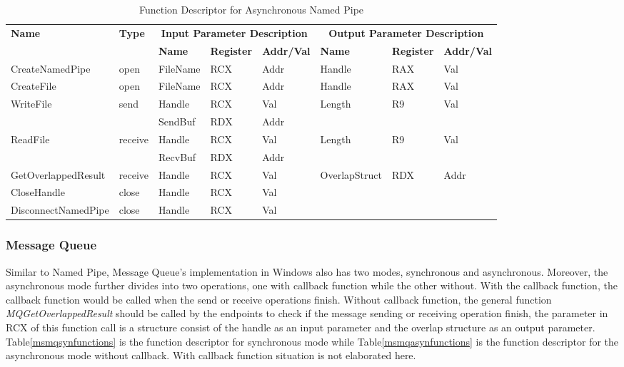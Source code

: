 \begin{table}[H]
  \centering
  \caption{Function Descriptor for Asynchronous Named Pipe}
  \label{nameasyn}
\begin{tabular}{|l|l|l|l|l|l|l|l|}
\hline
             \multirow{2}{*}{{\textbf{Name}}} & \multirow{2}{*}{{\textbf{Type}}} & \multicolumn{3}{c|}{\textbf{Input Parameter Description}} & \multicolumn{3}{c|}{\textbf{Output Parameter Description}} \\
              \cline{3-8} 
             & & \textbf{Name}& \textbf{Register} & \textbf{Addr/Val} & \textbf{Name}& \textbf{Register} &  \textbf{Addr/Val}  \\
             \hline
      CreateNamedPipe
       &open & FileName & RCX  & Addr &  Handle & RAX & Val\\
      \hline         
      CreateFile
       &open & FileName & RCX & Addr&  Handle & RAX & Val\\ 
      \hline              
      \multirow{2}{*}{WriteFile}
       &\multirow{2}{*}{send} &  Handle & RCX & Val & \multirow{2}{*}{Length} & \multirow{2}{*}{R9} & \multirow{2}{*}{Val}\\
        \cline{3-5} 
       & & SendBuf & RDX & Addr & & &\\
      \hline            
      \multirow{2}{*}{ReadFile}
       &\multirow{2}{*}{receive} &  Handle & RCX & Val& \multirow{2}{*}{Length} & \multirow{2}{*}{R9} & \multirow{2}{*}{Val}\\
        \cline{3-5} 
       & & RecvBuf & RDX  & Addr & & &\\
      \hline    
           GetOverlappedResult &
       receive &  Handle & RCX & Val &OverlapStruct &RDX & Addr\\
      \hline     
      CloseHandle &
       close &  Handle & RCX & Val & & &\\
      \hline            
      DisconnectNamedPipe &
      close &  Handle & RCX & Val & & &\\
      \hline               
  \end{tabular}  
\end{table}

\subsubsection{Message Queue}
Similar to Named Pipe, Message Queue's implementation in Windows also has two modes, synchronous and asynchronous. Moreover, the asynchronous mode further divides into two operations, one with callback function while the other without. With the callback function, the callback function would be called when the send or receive operations finish. Without callback function, the general function \textit{MQGetOverlappedResult} should be called by the endpoints to check if the message sending or receiving operation finish, the parameter in RCX of this function call is a structure consist of the handle as an input parameter and the overlap structure as an output parameter. Table\ref{msmqsynfunctions} is the function descriptor for synchronous mode while Table\ref{msmqasynfunctions} is the function descriptor for the asynchronous mode without callback. With callback function situation is not elaborated here.


